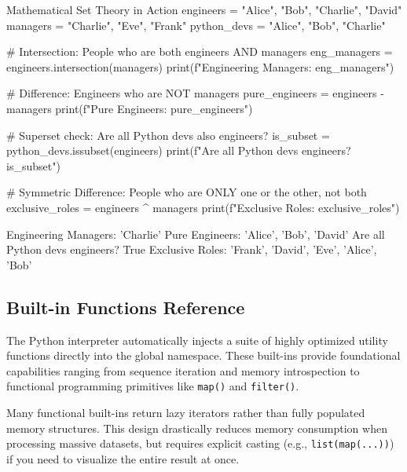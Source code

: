 \begin{pythoncode}[]{Mathematical Set Theory in Action}
engineers = {"Alice", "Bob", "Charlie", "David"}
managers = {"Charlie", "Eve", "Frank"}
python_devs = {"Alice", "Bob", "Charlie"}

# Intersection: People who are both engineers AND managers
eng_managers = engineers.intersection(managers)
print(f"Engineering Managers: {eng_managers}")

# Difference: Engineers who are NOT managers
pure_engineers = engineers - managers
print(f"Pure Engineers: {pure_engineers}")

# Superset check: Are all Python devs also engineers?
is_subset = python_devs.issubset(engineers)
print(f"Are all Python devs engineers? {is_subset}")

# Symmetric Difference: People who are ONLY one or the other, not both
exclusive_roles = engineers ^ managers
print(f"Exclusive Roles: {exclusive_roles}")
\end{pythoncode}
\begin{outputbox}
Engineering Managers: {'Charlie'}
Pure Engineers: {'Alice', 'Bob', 'David'}
Are all Python devs engineers? True
Exclusive Roles: {'Frank', 'David', 'Eve', 'Alice', 'Bob'}
\end{outputbox}

\subsection{Built-in Functions Reference}

The Python interpreter automatically injects a suite of highly optimized utility functions directly into the global namespace. These built-ins provide foundational capabilities ranging from sequence iteration and memory introspection to functional programming primitives like \texttt{map()} and \texttt{filter()}.

Many functional built-ins return lazy iterators rather than fully populated memory structures. This design drastically reduces memory consumption when processing massive datasets, but requires explicit casting (e.g., \texttt{list(map(...))}) if you need to visualize the entire result at once.

